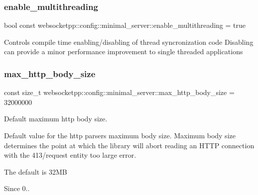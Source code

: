 \subsubsection{\texorpdfstring{enable\+\_\+multithreading}{enable\_multithreading}}
{\footnotesize\ttfamily bool const websocketpp\+::config\+::minimal\+\_\+server\+::enable\+\_\+multithreading = true\hspace{0.3cm}{\ttfamily [static]}}

Controls compile time enabling/disabling of thread syncronization code Disabling can provide a minor performance improvement to single threaded applications \mbox{\label{structwebsocketpp_1_1config_1_1minimal__server_a56756239e0904949156e630c1f48d95e}} 
\subsubsection{\texorpdfstring{max\+\_\+http\+\_\+body\+\_\+size}{max\_http\_body\_size}}
{\footnotesize\ttfamily const size\+\_\+t websocketpp\+::config\+::minimal\+\_\+server\+::max\+\_\+http\+\_\+body\+\_\+size = 32000000\hspace{0.3cm}{\ttfamily [static]}}



Default maximum http body size. 

Default value for the http parser\textquotesingle{}s maximum body size. Maximum body size determines the point at which the library will abort reading an H\+T\+TP connection with the 413/request entity too large error.

The default is 32\+MB

\begin{DoxySince}{Since}
0.. 
\end{DoxySince}
\mbox{\label{structwebsocketpp_1_1config_1_1minimal__server_adfad5099419b8e2090c3667d17e10008}} 
